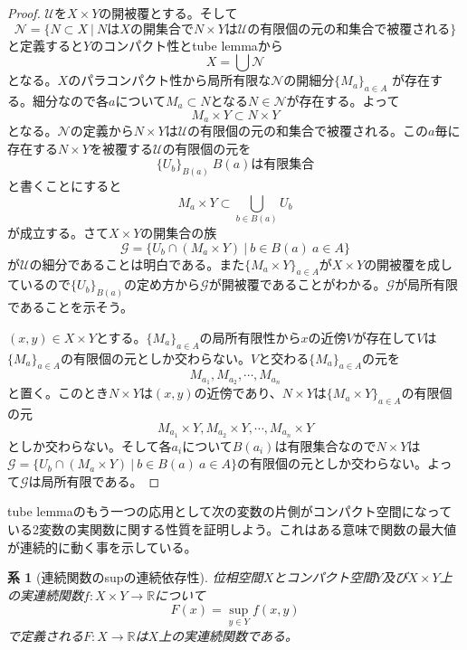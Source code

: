 \documentclass[leqno]{jsarticle}
\newtheorem{cor}[thm]{系}
\newcommand{\rr}{\mathbb{R}}
\begin{document}
\begin{proof}
$\mathcal{U}$を$X\times Y$の開被覆とする。そして
\[
\mathcal{N}=\{N\subset X\ |\ NはXの開集合でN\times Yは\mathcal{U}の有限個の元の和集合で被覆される\}
\]
と定義すると$Y$のコンパクト性とtube lemmaから
\[
X=\bigcup \mathcal{N}
\]
となる。$X$のパラコンパクト性から局所有限な$\mathcal{N}$の開細分$\{M_a\}_{a\in A}$
が存在する。細分なので各$a$について$M_a\subset N$となる$N\in \mathcal{N}$が存在する。よって
\[
M_a\times Y\subset N\times Y
\]
となる。$\mathcal{N}$の定義から$N\times Y$は$\mathcal{U}$の有限個の元の和集合で被覆される。この$a$毎に存在する$N\times Y$を被覆する$\mathcal{U}$の有限個の元を
\[
\{U_b\}_{B(a)}\ B(a)は有限集合
\]
と書くことにすると
\[
M_a\times Y\subset \bigcup_{b\in B(a)}U_b
\]
が成立する。さて$X\times Y$の開集合の族
\[
\mathcal{G}=\{U_b\cap (M_a\times Y)\ |\ b\in B(a)\ a\in A\}
\]
が$\mathcal{U}$の細分であることは明白である。また$\{M_a\times Y\}_{a\in A}$が$X\times Y$の開被覆を成しているので$\{U_b\}_{B(a)}$の定め方から$\mathcal{G}$が開被覆であることがわかる。$\mathcal{G}$が局所有限であることを示そう。\par 
$(x,y)\in X\times Y$とする。$\{M_a\}_{a\in A}$の局所有限性から$x$の近傍$V$が存在して$V$は$\{M_a\}_{a\in A}$の有限個の元としか交わらない。$V$と交わる$\{M_a\}_{a\in A}$の元を
\[
M_{a_1},M_{a_2},\cdots ,M_{a_n}
\]
と置く。このとき$N\times Y$は$(x,y)$の近傍であり、$N\times Y$は$\{M_a\times Y\}_{a\in A}$の有限個の元
\[
M_{a_1}\times Y,M_{a_2}\times Y,\cdots ,M_{a_n}\times Y
\]としか交わらない。そして各$a_i$について$B(a_i)$は有限集合なので$N\times Y$は$\mathcal{G}=\{U_b\cap (M_a\times Y)\ |\ b\in B(a)\ a\in A\}$の有限個の元としか交わらない。よって$\mathcal{G}$は局所有限である。
\end{proof}

tube lemmaのもう一つの応用として次の変数の片側がコンパクト空間になっている2変数の実関数に関する性質を証明しよう。これはある意味で関数の最大値が連続的に動く事を示している。
\begin{cor}[連続関数のsupの連続依存性]
位相空間$X$とコンパクト空間$Y$及び$X\times Y$上の実連続関数$f:X\times Y\to \rr$について
\[
F(x)=\sup_{y\in Y}f(x,y)
\]
で定義される$F:X\to \rr$は$X$上の実連続関数である。
\end{cor}
\end{document}
